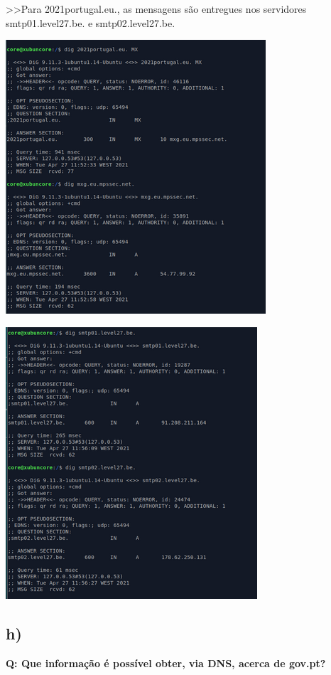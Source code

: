 \documentclass[a4paper]{article}
\begin{document}
\qquad >>Para 2021portugal.eu., as mensagens são entregues nos servidores smtp01.level27.be. e smtp02.level27.be.

\begin{center}
\includegraphics[scale=0.7]{images/2021portugal.eu}
\end{center}

\begin{center}
\includegraphics[scale=0.7]{images/smt01-02}
\end{center}

\subsection{ h)} \textbf{ Q: Que informação é possível obter, via DNS, acerca de gov.pt?}
\end{document}
